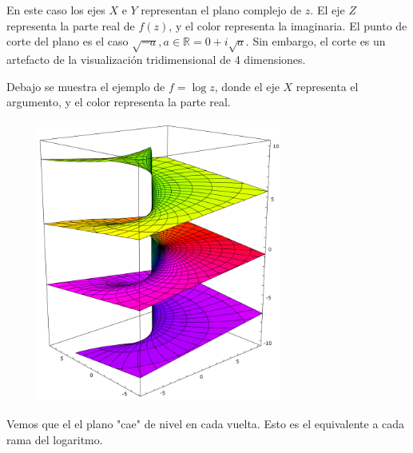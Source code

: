 \documentclass[a4paper, 11pt]{extarticle}
\begin{document}
\begin{multicols*}{2}
En este caso los ejes \(X\) e \(Y\) representan el plano complejo de \(z\). El eje \(Z\) representa la parte real de \(f(z)\), y el color representa
la imaginaria. El punto de corte del plano es el caso \(\sqrt{-a}, a \in
\mathbb{R}  = 0 + i \sqrt{a}\). Sin embargo, el corte es un artefacto de la
visualización tridimensional de 4 dimensiones.

Debajo se muestra el ejemplo de \(f = \log{z}\), donde el eje \(X\)
representa el argumento, y el color representa la parte real. 

\begin{figure}[H]
\centering
\includegraphics[width=8cm]{imagenes/riemann_log.png}
\end{figure}

Vemos que el el plano "cae" de nivel en cada vuelta. Esto es el equivalente a
cada rama del logaritmo.


\end{multicols*}
\pagebreak
\end{document}
